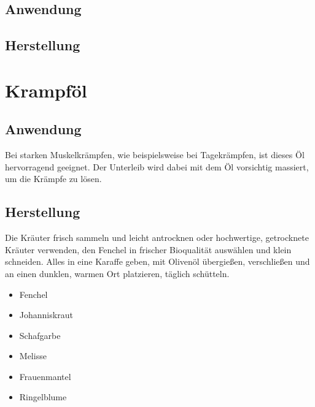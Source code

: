 
\subsection{Anwendung}
\subsection{Herstellung}




\newpage




\section{Krampföl}


 

\subsection{Anwendung}

Bei starken Muskelkrämpfen, wie beispielsweise bei Tagekrämpfen, ist dieses Öl hervorragend geeignet. Der Unterleib wird dabei mit dem Öl vorsichtig massiert, um die Krämpfe zu lösen.

\subsection{Herstellung}

Die Kräuter frisch sammeln und leicht antrocknen oder hochwertige, getrocknete Kräuter verwenden, den Fenchel in frischer Bioqualität auswählen und klein schneiden. Alles in eine Karaffe geben, mit Olivenöl übergießen, verschließen und an einen dunklen, warmen Ort platzieren, täglich schütteln.

\begin{itemize}
	\item Fenchel
	\item Johanniskraut
	\item Schafgarbe
	\item Melisse
	\item Frauenmantel
	\item Ringelblume
\end{itemize}

